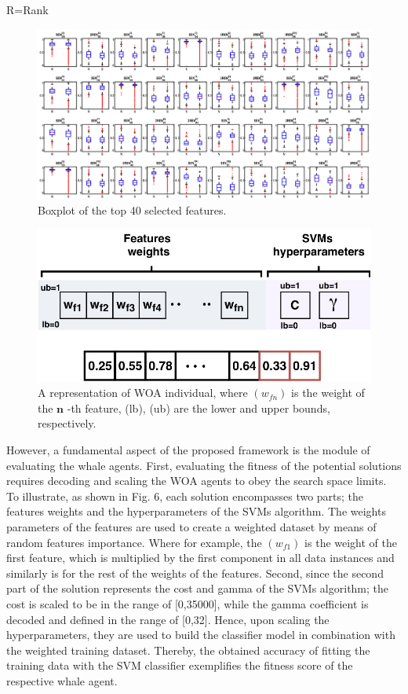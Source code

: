 R=Rank

\begin{figure}[htbp]
\centering
\includegraphics[width=0.8\linewidth]{images/a41c606205bf7eabfb56a60f2b4aef6e7e8c01c8fbc8cfcdeea8bca520e5cf96.jpg}
\caption{Boxplot of the top 40 selected features.}
\label{fig:5}
\end{figure}


\begin{figure}[htbp]
\centering
\includegraphics[width=0.8\linewidth]{images/7746e4b64e7a5067b8e62ecd8847e1dd076ae501b3346b678df26ce7efb7aa2e.jpg}
\caption{A representation of WOA individual, where $(w_{f n})$ is the weight of the $\mathbf{n}$ -th feature, (lb), (ub) are the lower and upper bounds, respectively.}
\label{fig:6}
\end{figure}


However, a fundamental aspect of the proposed framework is the module of evaluating the whale agents. First, evaluating the fitness of the potential solutions requires decoding and scaling the WOA agents to obey the search space limits. To illustrate, as shown in Fig. 6, each solution encompasses two parts; the features weights and the hyperparameters of the SVMs algorithm. The weights parameters of the features are used to create a weighted dataset by means of random features importance. Where for example, the $(w_{f1})$ is the weight of the first feature, which is multiplied by the first component in all data instances and similarly is for the rest of the weights of the features. Second, since the second part of the solution represents the cost and gamma of the SVMs algorithm; the cost is scaled to be in the range of [0,35000], while the gamma coefficient is decoded and defined in the range of [0,32]. Hence, upon scaling the hyperparameters, they are used to build the classifier model in combination with the weighted training dataset. Thereby, the obtained accuracy of fitting the training data with the SVM classifier exemplifies the fitness score of the respective whale agent.

